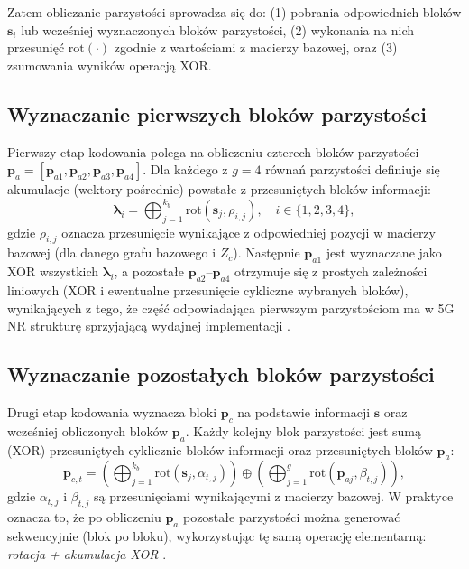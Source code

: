 Zatem obliczanie parzystości sprowadza się do: (1) pobrania odpowiednich bloków $\mathbf{s}_i$ lub wcześniej wyznaczonych
bloków parzystości, (2) wykonania na nich przesunięć $\mathrm{rot}(\cdot)$ zgodnie z wartościami z macierzy bazowej,
oraz (3) zsumowania wyników operacją XOR.

\subsection{Wyznaczanie pierwszych bloków parzystości}
Pierwszy etap kodowania polega na obliczeniu czterech bloków parzystości $\mathbf{p}_a = [\mathbf{p}_{a1},\mathbf{p}_{a2},\mathbf{p}_{a3},\mathbf{p}_{a4}]$.
Dla każdego z $g=4$ równań parzystości definiuje się akumulacje (wektory pośrednie) powstałe z przesuniętych bloków informacji:
\begin{equation}
\boldsymbol{\lambda}_i = \bigoplus_{j=1}^{k_b} \mathrm{rot}\!\left(\mathbf{s}_j, \rho_{i,j}\right), \quad i \in \{1,2,3,4\},
\label{eq:lambda_def}
\end{equation}
gdzie $\rho_{i,j}$ oznacza przesunięcie wynikające z odpowiedniej pozycji w macierzy bazowej (dla danego grafu bazowego i $Z_c$).
Następnie $\mathbf{p}_{a1}$ jest wyznaczane jako XOR wszystkich $\boldsymbol{\lambda}_i$, a pozostałe $\mathbf{p}_{a2}$--$\mathbf{p}_{a4}$
otrzymuje się z prostych zależności liniowych (XOR i ewentualne przesunięcie cykliczne wybranych bloków), wynikających z tego,
że część odpowiadająca pierwszym parzystościom ma w 5G NR strukturę sprzyjającą wydajnej implementacji \cite{bib:nguyen2019_qcldpc}.

\subsection{Wyznaczanie pozostałych bloków parzystości}
Drugi etap kodowania wyznacza bloki $\mathbf{p}_c$ na podstawie informacji $\mathbf{s}$ oraz wcześniej obliczonych bloków $\mathbf{p}_a$.
Każdy kolejny blok parzystości jest sumą (XOR) przesuniętych cyklicznie bloków informacji oraz przesuniętych bloków $\mathbf{p}_a$:
\begin{equation}
\mathbf{p}_{c,t} =
\left(\bigoplus_{j=1}^{k_b} \mathrm{rot}\!\left(\mathbf{s}_j, \alpha_{t,j}\right)\right)
\oplus
\left(\bigoplus_{j=1}^{g} \mathrm{rot}\!\left(\mathbf{p}_{a j}, \beta_{t,j}\right)\right),
\label{eq:pc_def}
\end{equation}
gdzie $\alpha_{t,j}$ i $\beta_{t,j}$ są przesunięciami wynikającymi z macierzy bazowej. W praktyce oznacza to, że po obliczeniu $\mathbf{p}_a$
pozostałe parzystości można generować sekwencyjnie (blok po bloku), wykorzystując tę samą operację elementarną:
\emph{rotacja + akumulacja XOR} \cite{bib:nguyen2019_qcldpc}.




